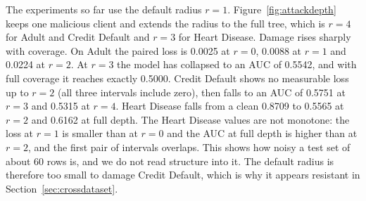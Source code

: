 \documentclass[11pt]{article}
\newcommand{\rev}[1]{{\color{blue}#1}}
\begin{document}
\rev{The experiments so far use the default radius $r=1$. Figure~\ref{fig:attackdepth} keeps one malicious client and extends the radius to the full tree, which is $r=4$ for Adult and Credit Default and $r=3$ for Heart Disease. Damage rises sharply with coverage. On Adult the paired loss is 0.0025 at $r=0$, 0.0088 at $r=1$ and 0.0224 at $r=2$. At $r=3$ the model has collapsed to an AUC of 0.5542, and with full coverage it reaches exactly 0.5000. Credit Default shows no measurable loss up to $r=2$ (all three intervals include zero), then falls to an AUC of 0.5751 at $r=3$ and 0.5315 at $r=4$. Heart Disease falls from a clean 0.8709 to 0.5565 at $r=2$ and 0.6162 at full depth. The Heart Disease values are not monotone: the loss at $r=1$ is smaller than at $r=0$ and the AUC at full depth is higher than at $r=2$, and the first pair of intervals overlaps. This shows how noisy a test set of about 60 rows is, and we do not read structure into it. The default radius is therefore too small to damage Credit Default, which is why it appears resistant in Section~\ref{sec:crossdataset}.}
\end{document}

